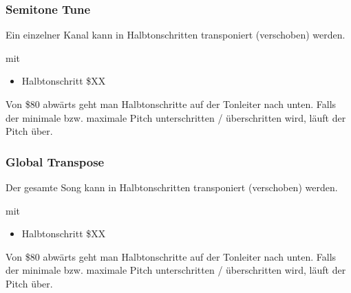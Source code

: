 \subsubsection{Semitone Tune}

Ein einzelner Kanal kann in Halbtonschritten transponiert (verschoben) werden.

\medskip



\medskip

mit

\begin{itemize}
	\item Halbtonschritt \$XX
\end{itemize}

Von \$80 abwärts geht man Halbtonschritte auf der Tonleiter nach unten. Falls der minimale bzw. maximale Pitch unterschritten / überschritten wird, läuft der Pitch über.

\subsubsection{Global Transpose}

Der gesamte Song kann in Halbtonschritten transponiert (verschoben) werden.

\medskip



\medskip

mit

\begin{itemize}
	\item Halbtonschritt \$XX
\end{itemize}

Von \$80 abwärts geht man Halbtonschritte auf der Tonleiter nach unten. Falls der minimale bzw. maximale Pitch unterschritten / überschritten wird, läuft der Pitch über.